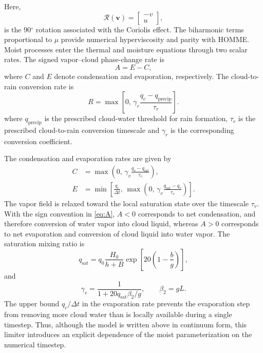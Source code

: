\documentclass[12pt]{article}
\begin{document}
	Here, 
\begin{equation}
	\mathcal{R}(\mathbf{v})
	=
	\begin{bmatrix}
		-v\\
		u
	\end{bmatrix},
	\label{eq:rotation}
\end{equation}
	is the 90$^\circ$ rotation associated with the Coriolis effect. The biharmonic terms proportional to $\mu$ provide numerical
	hyperviscosity and parity with HOMME. Moist processes enter the thermal and moisture equations through two scalar rates. The signed vapor--cloud phase-change rate is
	\begin{equation}
		A=E-C,
		\label{eq:A}
	\end{equation}
	where $C$ and $E$ denote condensation and evaporation, respectively. The cloud-to-rain conversion rate is
	 \begin{equation}
	 	R
	 	=
	 	\max\left[
	 	0,\,
	 	\gamma_r
	 	\frac{q_c-q_{\mathrm{precip}}}{\tau_r}
	 	\right].
	 	\label{eq:rainrate}
	 \end{equation}
	 where $q_{\mathrm{precip}}$ is the prescribed cloud-water threshold for rain formation, $\tau_r$ is the prescribed cloud-to-rain conversion timescale and $\gamma_r$ is the corresponding conversion coefficient.
	 
	  The condensation and evaporation rates are given by 
	\begin{align}
		C
		&=
		\max\left(
		0,\,
		\gamma_v
		\frac{q_v-q_{\mathrm{sat}}}{\tau_v}
		\right),
		\label{eq:condensation}
		\\
		E
		&=
		\min\left[
		\frac{q_c}{\Delta t},
		\,
		\max\left(
		0,\,
		\gamma_v
		\frac{q_{\mathrm{sat}}-q_v}{\tau_v}
		\right)
		\right].
		\label{eq:evaporation}
	\end{align}
	  The vapor field is relaxed toward the local saturation state over the  timescale $\tau_v$. With the sign convention in \eqref{eq:A},
	  $A<0$ corresponds to net condensation, and therefore conversion of water vapor into cloud liquid, whereas $A>0$ corresponds to net evaporation and conversion of cloud liquid into water vapor. The saturation mixing ratio is
	  \begin{equation}
	  	q_{\mathrm{sat}}
	  	=
	  	q_0\frac{H_0}{h+B}
	  	\exp\left[
	  	20\left(1-\frac{b}{g}\right)
	  	\right],
	  	\label{eq:qsat}
	  \end{equation}
	 and 
	 \begin{equation}
	 	\gamma_v
	 	=
	 	\frac{1}
	 	{1+20q_{\mathrm{sat}}\beta_2/g},
	 	\qquad
	 	\beta_2=gL.
	 	\label{eq:gammav}
	 \end{equation}
	 The upper bound $q_c/\Delta t$ in the evaporation rate prevents the evaporation step from removing more cloud water than is locally available during a single timestep. Thus, although the model is written above in continuum form, this limiter introduces an explicit dependence of the moist parameterization on the numerical timestep.
	 
\end{document}
